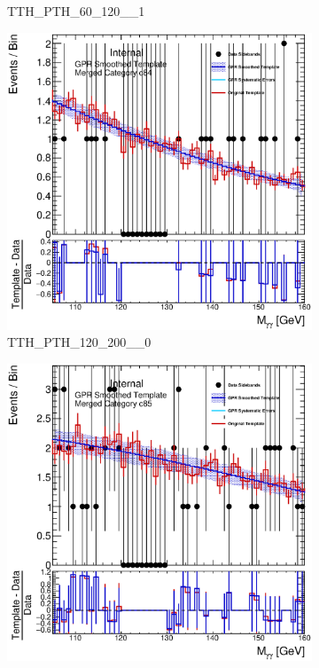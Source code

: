 \begin{figure}
\begin{center}
\begin{subfigure}[T]{0.49\linewidth}
	\caption{TTH\_PTH\_60\_120\_\_1}
\end{subfigure}
\begin{subfigure}[T]{0.49\linewidth}
	\centering
	\includegraphics[width=\linewidth]{figures/background/gpr/coupCatTemplates/GPR_Smoothed_Plot_hmgg_c84.eps}
	\caption{TTH\_PTH\_120\_200\_\_0}
\end{subfigure}
\begin{subfigure}[T]{0.49\linewidth}
	\centering
	\includegraphics[width=\linewidth]{figures/background/gpr/coupCatTemplates/GPR_Smoothed_Plot_hmgg_c85.eps}

\end{subfigure}
\end{center}
\end{figure}
